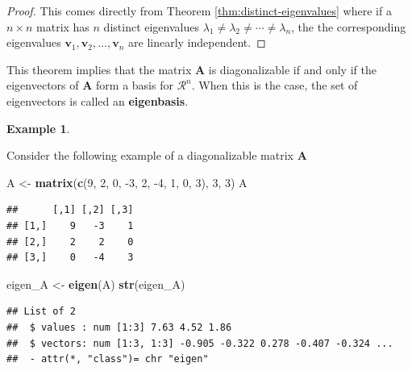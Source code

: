 \documentclass[
]{book}
\newenvironment{Shaded}{\begin{snugshade}}{\end{snugshade}}
\newcommand{\DecValTok}[1]{\textcolor[rgb]{0.00,0.00,0.81}{#1}}
\newcommand{\KeywordTok}[1]{\textcolor[rgb]{0.13,0.29,0.53}{\textbf{#1}}}
\newcommand{\NormalTok}[1]{#1}
\newcommand{\StringTok}[1]{\textcolor[rgb]{0.31,0.60,0.02}{#1}}
\theoremstyle{definition}
\theoremstyle{definition}
\newtheorem{example}{Example}[chapter]
\theoremstyle{definition}
\theoremstyle{remark}
\begin{document}
\begin{proof}
{}This comes directly from Theorem \ref{thm:distinct-eigenvalues} where if a \(n \times n\) matrix has \(n\) distinct eigenvalues \(\lambda_1 \neq \lambda_2 \neq \cdots \neq \lambda_n\), the the corresponding eigenvalues \(\mathbf{v}_1, \mathbf{v}_2, \ldots, \mathbf{v}_n\) are linearly independent.
\end{proof}

This theorem implies that the matrix \(\mathbf{A}\) is diagonalizable if and only if the eigenvectors of \(\mathbf{A}\) form a basis for \(\mathcal{R}^n\). When this is the case, the set of eigenvectors is called an \textbf{eigenbasis}.

\begin{example}
\protect\hypertarget{exm:unlabeled-div-180}{}\label{exm:unlabeled-div-180}

Consider the following example of a diagonalizable matrix \(\mathbf{A}\)

\begin{Shaded}
\begin{Highlighting}[]
\NormalTok{A <-}\StringTok{ }\KeywordTok{matrix}\NormalTok{(}\KeywordTok{c}\NormalTok{(}\DecValTok{9}\NormalTok{, }\DecValTok{2}\NormalTok{, }\DecValTok{0}\NormalTok{, }\DecValTok{-3}\NormalTok{, }\DecValTok{2}\NormalTok{, }\DecValTok{-4}\NormalTok{, }\DecValTok{1}\NormalTok{, }\DecValTok{0}\NormalTok{, }\DecValTok{3}\NormalTok{), }\DecValTok{3}\NormalTok{, }\DecValTok{3}\NormalTok{)}
\NormalTok{A}
\end{Highlighting}
\end{Shaded}

\begin{verbatim}
##      [,1] [,2] [,3]
## [1,]    9   -3    1
## [2,]    2    2    0
## [3,]    0   -4    3
\end{verbatim}

\begin{Shaded}
\begin{Highlighting}[]
\NormalTok{eigen_A <-}\StringTok{ }\KeywordTok{eigen}\NormalTok{(A)}
\KeywordTok{str}\NormalTok{(eigen_A)}
\end{Highlighting}
\end{Shaded}

\begin{verbatim}
## List of 2
##  $ values : num [1:3] 7.63 4.52 1.86
##  $ vectors: num [1:3, 1:3] -0.905 -0.322 0.278 -0.407 -0.324 ...
##  - attr(*, "class")= chr "eigen"
\end{verbatim}


\end{example}
\end{document}
